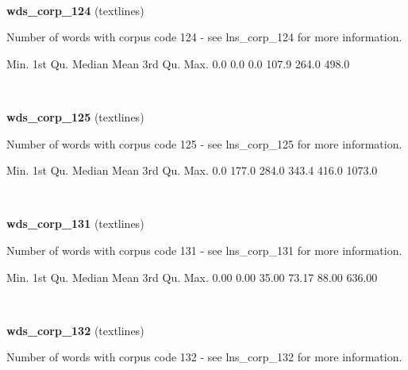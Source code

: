\documentclass[]{article}
\newenvironment{Shaded}{\begin{snugshade}}{\end{snugshade}}
\newcommand{\FloatTok}[1]{\textcolor[rgb]{0.00,0.00,0.81}{{#1}}}
\newcommand{\NormalTok}[1]{{#1}}
\begin{document}
~

\vspace{1em}

\textbf{wds\_corp\_124} (textlines)

Number of words with corpus code 124 - see lns\_corp\_124 for more
information.

\begin{Shaded}
\begin{Highlighting}[]
   \NormalTok{Min. 1st Qu.  Median    Mean 3rd Qu.    Max. }
    \FloatTok{0.0}     \FloatTok{0.0}     \FloatTok{0.0}   \FloatTok{107.9}   \FloatTok{264.0}   \FloatTok{498.0} 
\end{Highlighting}
\end{Shaded}

~

\vspace{1em}

\textbf{wds\_corp\_125} (textlines)

Number of words with corpus code 125 - see lns\_corp\_125 for more
information.

\begin{Shaded}
\begin{Highlighting}[]
   \NormalTok{Min. 1st Qu.  Median    Mean 3rd Qu.    Max. }
    \FloatTok{0.0}   \FloatTok{177.0}   \FloatTok{284.0}   \FloatTok{343.4}   \FloatTok{416.0}  \FloatTok{1073.0} 
\end{Highlighting}
\end{Shaded}

~

\vspace{1em}

\textbf{wds\_corp\_131} (textlines)

Number of words with corpus code 131 - see lns\_corp\_131 for more
information.

\begin{Shaded}
\begin{Highlighting}[]
   \NormalTok{Min. 1st Qu.  Median    Mean 3rd Qu.    Max. }
   \FloatTok{0.00}    \FloatTok{0.00}   \FloatTok{35.00}   \FloatTok{73.17}   \FloatTok{88.00}  \FloatTok{636.00} 
\end{Highlighting}
\end{Shaded}

~

\vspace{1em}

\textbf{wds\_corp\_132} (textlines)

Number of words with corpus code 132 - see lns\_corp\_132 for more
information.
\end{document}
